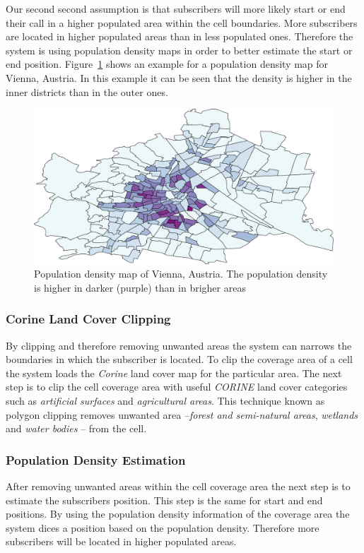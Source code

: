 Our second second assumption is that subscribers will more likely start or end their call in a higher populated area within the cell boundaries. More subscribers are located in higher populated areas than in less populated ones. Therefore the system is using population density maps in order to better estimate the start or end position. Figure~\ref{fig:pop_vienna} shows an example for a population density map for Vienna, Austria. In this example it can be seen that the density is higher in the inner districts than in the outer ones.
\begin{figure}
	\centering
	\includegraphics[width=0.7\linewidth]{./images/pop_vienna}
	\caption{Population density map of Vienna, Austria. The population density is higher in darker (purple) than in brigher areas}
	\label{fig:pop_vienna}
\end{figure}
\subsubsection{Corine Land Cover Clipping}
By clipping and therefore removing unwanted areas the system can narrows the boundaries in which the subscriber is located. To clip the coverage area of a cell the system loads the \emph{Corine} land cover map for the particular area. The next step is to clip the cell coverage area with useful \emph{CORINE} land cover categories such as \emph{artificial surfaces} and \emph{agricultural areas}. This technique known as polygon clipping removes unwanted area --\emph{forest and semi-natural areas}, \emph{wetlands} and \emph{water bodies} -- from the cell. 
\subsubsection{Population Density Estimation}
After removing unwanted areas within the cell coverage area the next step is to estimate the subscribers position. This step is the same for start and end positions. By using the population density information of the coverage area the system dices a position based on the population density. Therefore more subscribers will be located in higher populated areas.

